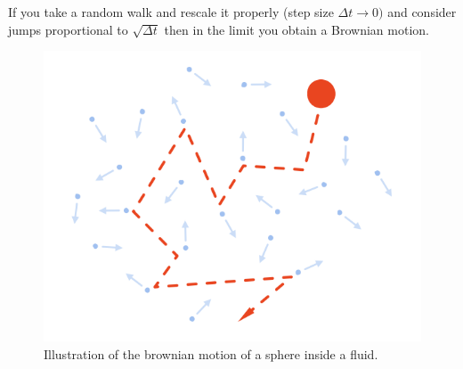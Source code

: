 If you take a random walk and rescale it properly (step size $\Delta t \to 0)$ and consider jumps proportional to $\sqrt{\Delta t}$ then in the limit you obtain a Brownian motion.

\begin{figure} [H]
    \centering
    \includegraphics[width=0.5\linewidth]{img/brownian_motion.png}
    \caption{Illustration of the brownian motion of a sphere inside a fluid.}
\end{figure}
